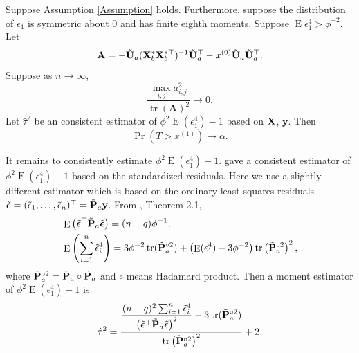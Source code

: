 \documentclass[smallextended]{svjour3}       %
\DeclareMathOperator{\mytr}{tr}
\DeclareMathOperator{\myE}{E}
\newcommand{\By}{\mathbf{y}}    \newcommand{\Bz}{\mathbf{z}}
\newcommand{\BA}{\mathbf{A}}    \newcommand{\BB}{\mathbf{B}}    \newcommand{\BC}{\mathbf{C}}    \newcommand{\BD}{\mathbf{D}}    \newcommand{\BE}{\mathbf{E}}    \newcommand{\BF}{\mathbf{F}}    \newcommand{\BG}{\mathbf{G}}    \newcommand{\BH}{\mathbf{H}}    \newcommand{\BI}{\mathbf{I}}    \newcommand{\BJ}{\mathbf{J}}    \newcommand{\BK}{\mathbf{K}}    \newcommand{\BL}{\mathbf{L}}
\begin{document}
\begin{theorem}
    Suppose Assumption \ref{Assumption} holds.
    Furthermore,
    suppose the distribution of $\epsilon_1$ is symmetric about $0$ and has finite eighth moments.
    Suppose $\myE \epsilon_1^4> \phi^{-2}$.
Let
    \begin{equation*}
        \BA=
 -\tilde{\BU}_a ( \BX_b^* \BX_b^{*\top} )^{-1} \tilde{\BU}_a^\top 
-x^{(0)}\tilde{\BU}_a \tilde{\BU}_a^\top
        .
    \end{equation*}
    Suppose as $n\to \infty$,
    \begin{equation}\label{eq:jianchiCondition}
        \frac{ 
            \max_{i,j}a_{i,j}^2
    }{\mytr \left(
                \BA \right)^2}  \to 0.
    \end{equation}
        Let $\hat \tau^2$ be an consistent estimator of $\phi^2 \myE (\epsilon_1^4)-1$ based on $\mathbf{X}$, $\By$.
        Then 
    \begin{equation*}
        \Pr\left( T >
            x^{(1)}
    \right)
            \to \alpha.
    \end{equation*}
    \label{thm:criticalValue}
\end{theorem}

It remains to consistently estimate $\phi^2 \myE (\epsilon_1^4)-1$.
\cite{Bai2017} gave a consistent estimator of $\phi^2 \myE (\epsilon_1^4)-1$  based on the standardized residuals.
        Here we use a slightly different estimator which is based on the ordinary least squares residuals $\tilde \bepsilon=(\tilde \epsilon_1,\ldots, \tilde \epsilon_n)^\top= \tilde \BP_a \By$.
    From \cite{Bai2017}, Theorem 2.1, 
    \begin{align*}
        &\myE \left( \tilde \bepsilon^\top  \tilde \BP_a \tilde \bepsilon \right)
        = (n-q) \phi^{-1},
        \\
        &\myE \left( \sum_{i=1}^n \tilde \epsilon_i^4 \right)
        =
        3\phi^{-2} \mytr (\tilde \BP_a^{\circ 2}) 
        +\left( \myE (\epsilon_1^4)-3 \phi^{-2}\right)
        \mytr \left( \tilde \BP_a^{\circ 2}  \right)^2,
    \end{align*}
    where $\tilde {\mathbf{P}}_a^{\circ 2}=\tilde {\mathbf{P}}_a \circ \tilde {\mathbf{P}}_a$ and $\circ$ means Hadamard product.
    Then a moment estimator of $\phi^{2}\myE (\epsilon_1^4)-1$ is 
\begin{equation*}
    \hat \tau^2 =
    \frac{
        \displaystyle\frac{(n-q)^2 \sum_{i=1}^n \tilde{\epsilon}_i^4}{\left( \tilde \bepsilon^\top \tilde \BP_a  \tilde \bepsilon \right)^2}
        - 3\mytr (\tilde \BP_a^{\circ 2})
    }{
        \mytr\left(  \tilde \BP_a^{\circ 2} \right)^2
    }
    +2.
\end{equation*}
\end{document}
